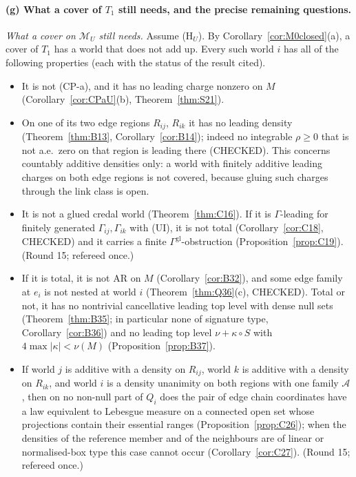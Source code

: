 \documentclass[11pt]{article}
\theoremstyle{definition}
\theoremstyle{remark}
\newcommand{\M}{\mathcal M}
\begin{document}
\paragraph{(g) What a cover of $T_1$ still needs, and the precise remaining questions.} \emph{What a cover on $\M_U$ still needs.} Assume (H$_U$). By Corollary~\ref{cor:M0closed}(a), a cover of $T_1$ has a world that does not add up. Every such world $i$ has all of the following properties (each with the status of the result cited).
\begin{itemize}[leftmargin=*]
\item It is not (CP-a), and it has no leading charge nonzero on $M$ (Corollary~\ref{cor:CPaU}(b), Theorem~\ref{thm:S21}).
\item On one of its two edge regions $R_{ij}$, $R_{ik}$ it has no leading density (Theorem~\ref{thm:B13}, Corollary~\ref{cor:B14}); indeed no integrable $\rho\ge0$ that is not a.e.\ zero on that region is leading there (CHECKED). This concerns countably additive densities only: a world with finitely additive leading charges on both edge regions is not covered, because gluing such charges through the link class is open.
\item It is not a glued credal world (Theorem~\ref{thm:C16}). If it is $\Gamma$-leading for finitely generated $\Gamma_{ij},\Gamma_{ik}$ with (UI), it is not total (Corollary~\ref{cor:C18}, CHECKED) and it carries a finite $\Gamma^{\mathrm{gl}}$-obstruction (Proposition~\ref{prop:C19}). (Round 15; refereed once.)
\item If it is total, it is not AR on $M$ (Corollary~\ref{cor:B32}), and some edge family at $e_i$ is not nested at world $i$ (Theorem~\ref{thm:Q36}(c), CHECKED). Total or not, it has no nontrivial cancellative leading top level with dense null sets (Theorem~\ref{thm:B35}; in particular none of signature type, Corollary~\ref{cor:B36}) and no leading top level $\nu+\kappa\circ S$ with $4\max|\kappa|<\nu(M)$ (Proposition~\ref{prop:B37}).
\item If world $j$ is additive with a density on $R_{ij}$, world $k$ is additive with a density on $R_{ik}$, and world $i$ is a density unanimity on both regions with one family $\mathcal A$, then on no non-null part of $Q_i$ does the pair of edge chain coordinates have a law equivalent to Lebesgue measure on a connected open set whose projections contain their essential ranges (Proposition~\ref{prop:C26}); when the densities of the reference member and of the neighbours are of linear or normalised-box type this case cannot occur (Corollary~\ref{cor:C27}). (Round 15; refereed once.)
\end{itemize}
\end{document}
